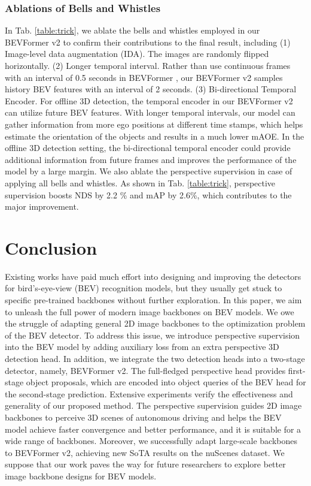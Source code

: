 \documentclass[10pt,twocolumn,letterpaper]{article}
\begin{document}
\subsubsection{Ablations of Bells and Whistles}
\label{sec:bells_and_whistles}
In Tab. \ref{table:trick}, we ablate the bells and whistles employed in our BEVFormer v2 to confirm their contributions to the final result, including 
(1) Image-level data augmentation (IDA). The images are randomly flipped horizontally. 
(2) Longer temporal interval. Rather than use continuous frames with an interval of 0.5 seconds in BEVFormer \cite{bevformer}, our BEVFormer v2 samples history BEV features with an interval of 2 seconds.
(3) Bi-directional Temporal Encoder. For offline 3D detection, the temporal encoder in our BEVFormer v2 can utilize future BEV features.
With longer temporal intervals, our model can gather information from more ego positions at different time stamps, which helps estimate the orientation of the objects and results in a much lower mAOE.
In the offline 3D detection setting, the bi-directional temporal encoder could provide additional information from future frames and improves the performance of the model by a large margin.
We also ablate the perspective supervision in case of applying all bells and whistles.
As shown in Tab. \ref{table:trick}, perspective supervision boosts NDS by 2.2 \% and mAP by 2.6\%, which contributes to the major improvement.
 \section{Conclusion}
Existing works have paid much effort into designing and improving the detectors for bird's-eye-view (BEV) recognition models, but they usually get stuck to specific pre-trained backbones without further exploration.
In this paper, we aim to unleash the full power of modern image backbones on BEV models.
We owe the struggle of adapting general 2D image backbones to the optimization problem of the BEV detector. 
To address this issue, we introduce perspective supervision into the BEV model by adding auxiliary loss from an extra perspective 3D detection head.
In addition, we integrate the two detection heads into a two-stage detector, namely, BEVFormer v2. 
The full-fledged perspective head provides first-stage object proposals, which are encoded into object queries of the BEV head for the second-stage prediction.
Extensive experiments verify the effectiveness and generality of our proposed method.
The perspective supervision guides 2D image backbones to perceive 3D scenes of autonomous driving and helps the BEV model achieve faster convergence and better performance, and it is suitable for a wide range of backbones.
Moreover, we successfully adapt large-scale backbones to BEVFormer v2, achieving new SoTA results on the nuScenes dataset. 
We suppose that our work paves the way for future researchers to explore
better image backbone designs for BEV models.
\end{document}
